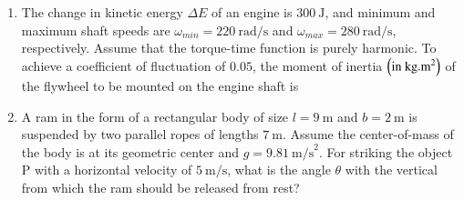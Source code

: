 \documentclass[journal]{IEEEtran}
\begin{document}
\begin{enumerate}[leftmargin=0pt]
\begin{enumerate}
\end{enumerate}

\hfill{}

\vspace{4mm}

\item
The change in kinetic energy $\Delta E$ of an engine is $300~\text{J}$, and minimum and maximum shaft speeds are $\omega_{min} = 220~\text{rad/s}$ and $\omega_{max} = 280~\text{rad/s}$, respectively. Assume that the torque-time function is purely harmonic. To achieve a coefficient of fluctuation of $0.05$, the moment of inertia $\left(\text{in kg.m}^2\right)$ of the flywheel to be mounted on the engine shaft is

\vspace{2mm}

\begin{enumerate}
\end{enumerate}

\hfill{}

\item
A ram in the form of a rectangular body of size $l = 9~\text{m}$ and $b = 2~\text{m}$ is suspended by two parallel ropes of lengths $7~\text{m}$. Assume the center-of-mass of the body is at its geometric center and $g = 9.81~\text{m/s}^2$. For striking the object P with a horizontal velocity of $5~\text{m/s}$, what is the angle $\theta$ with the vertical from which the ram should be released from rest?


\end{enumerate}
\end{document}
